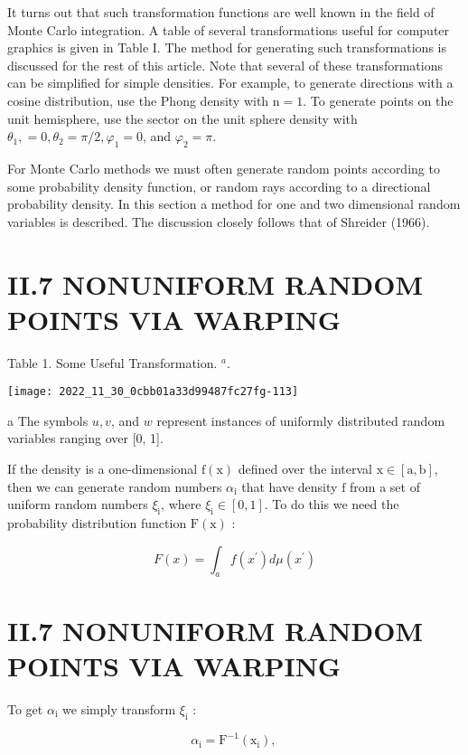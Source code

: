\begin{CJK}{UTF8}{gbsn}
It turns out that such transformation functions are well known in the field of Monte Carlo integration. A table of several transformations useful for computer graphics is given in Table I. The method for generating such transformations is discussed for the rest of this article. Note that several of these transformations can be simplified for simple densities. For example, to generate directions with a cosine distribution, use the Phong density with $\mathrm{n}=1$. To generate points on the unit hemisphere, use the sector on the unit sphere density with $\theta_{1},=0, \theta_{2}=\pi / 2, \varphi_{1}=0$, and $\varphi_{2}=\pi$.

For Monte Carlo methods we must often generate random points according to some probability density function, or random rays according to a directional probability density. In this section a method for one and two dimensional random variables is described. The discussion closely follows that of Shreider (1966).

\section{II.7 NONUNIFORM RANDOM POINTS VIA WARPING}
Table 1. Some Useful Transformation. ${ }^{a}$.

\begin{center}
\texttt{[image: 2022\_11\_30\_0cbb01a33d99487fc27fg-113]}
\end{center}

a The symbols $u, v$, and $w$ represent instances of uniformly distributed random variables ranging over [0, 1].

If the density is a one-dimensional $\mathrm{f}(\mathrm{x})$ defined over the interval $\mathrm{x} \in[\mathrm{a}, \mathrm{b}]$, then we can generate random numbers $\alpha_{\mathrm{i}}$ that have density $\mathrm{f}$ from a set of uniform random numbers $\xi_{\mathrm{i}}$, where $\xi_{\mathrm{i}} \in[0,1]$. To do this we need the probability distribution function $\mathrm{F}(\mathrm{x})$ :

$$
F(x)=\int_{a} f\left(x^{\prime}\right) d \mu\left(x^{\prime}\right)
$$

\section{II.7 NONUNIFORM RANDOM POINTS VIA WARPING}
To get $\alpha_{\mathrm{i}}$ we simply transform $\xi_{\mathrm{i}}$ :

$$
\alpha_{\mathrm{i}}=\mathrm{F}^{-1}\left(\mathrm{x}_{\mathrm{i}}\right) \text {, }
$$


\end{CJK}
